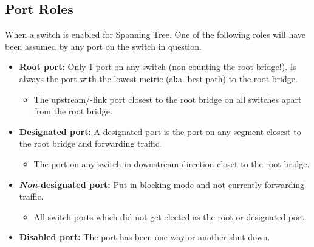\begin{table}[h]
    \centering
    \caption{Spanning Tree standards}
    \label{stpstandards}
\end{table}

\subsection{Port Roles}

When a switch is enabled for Spanning Tree. One of the following roles will have been assumed by any port on the switch in question.

\begin{itemize}
    \item \textbf{Root port:} Only 1 port on any switch (non-counting the root bridge!). Is always the port with the lowest metric (aka. best path) to the root bridge.
    \begin{itemize}
        \item The upstream/-link port closest to the root bridge on all switches apart from the root bridge.
    \end{itemize}
    \item \textbf{Designated port:} A designated port is the port on any segment closest to the root bridge and forwarding traffic.
    \begin{itemize}
        \item The port on any switch in downstream direction closet to the root bridge.
    \end{itemize}
    \item \textbf{\textit{Non}-designated port:} Put in blocking mode and not currently forwarding traffic.
    \begin{itemize}
        \item All switch ports which did not get elected as the root or designated port.
    \end{itemize}
    \item \textbf{Disabled port:} The port has been one-way-or-another shut down.
\end{itemize}

